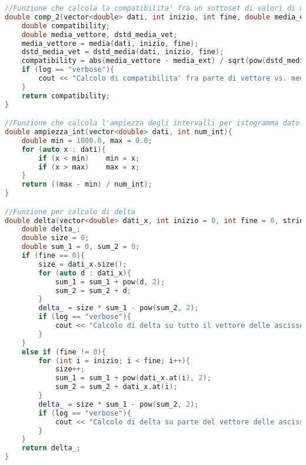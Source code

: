 \documentclass[a4paper,11pt,oneside]{article}
\begin{document}
\begin{lstlisting}[language=C++, label=lst:statistica.h, caption=statistica.h]
//Funzione che calcola la compatibilita' fra un sottoset di valori di un vettore e uno specifico valore di media e dev std sulla media forniti separatamente
double comp_2(vector<double> dati, int inizio, int fine, double media_ext, double dstd_media_ext, string log = ""){
    double compatibility;
    double media_vettore, dstd_media_vet;
    media_vettore = media(dati, inizio, fine);
    dstd_media_vet = dstd_media(dati, inizio, fine);
    compatibility = abs(media_vettore - media_ext) / sqrt(pow(dstd_media_vet, 2) + pow(dstd_media_ext, 2));
    if (log == "verbose"){
        cout << "Calcolo di compatibilita' fra parte di vettore vs. media e dstd media esterne (" << compatibility << ")" << endl;
    }
    return compatibility;
}

//Funzione che calcola l'ampiezza degli intervalli per istogramma dato un vettore e il numero di intervalli
double ampiezza_int(vector<double> dati, int num_int){
    double min = 1000.0, max = 0.0;
    for (auto x : dati){
        if (x < min)    min = x;
        if (x > max)    max = x;
    }
    return ((max - min) / num_int);
}

//Funzione per calcolo di delta
double delta(vector<double> dati_x, int inizio = 0, int fine = 0, string log = ""){
    double delta_;
    double size = 0;
    double sum_1 = 0, sum_2 = 0;
    if (fine == 0){
        size = dati_x.size();
        for (auto d : dati_x){
            sum_1 = sum_1 + pow(d, 2);
            sum_2 = sum_2 + d;
        }
        delta_ = size * sum_1 - pow(sum_2, 2);
        if (log == "verbose"){
            cout << "Calcolo di delta su tutto il vettore delle ascisse per chi quadro (" << delta_ << ")" << endl;
        }
    }
    else if (fine != 0){
        for (int i = inizio; i < fine; i++){
            size++;
            sum_1 = sum_1 + pow(dati_x.at(i), 2);
            sum_2 = sum_2 + dati_x.at(i);
        }
        delta_ = size * sum_1 - pow(sum_2, 2);
        if (log == "verbose"){
            cout << "Calcolo di delta su parte del vettore delle ascisse per chi quadro (" << delta_ << ")" << endl;
        }
    }
    return delta_;
}


\end{lstlisting}
\end{document}
